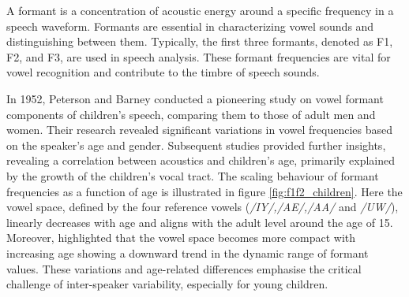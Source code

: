 A formant is a concentration of acoustic energy around a specific frequency in a speech waveform. Formants are essential in characterizing vowel sounds and distinguishing between them. Typically, the first three formants, denoted as F1, F2, and F3, are used in speech analysis. These formant frequencies are vital for vowel recognition and contribute to the timbre of speech sounds.

In 1952, Peterson and Barney \cite{first_vowel_study} conducted a pioneering study on vowel formant components of children's speech, comparing them to those of adult men and women. Their research revealed significant variations in vowel frequencies based on the speaker's age and gender. Subsequent studies \cite{reviewASRchildren,Acoustic_change_children,why_children_speech_no_working} provided further insights, revealing a correlation between acoustics and children's age, primarily explained by the growth of the children's vocal tract. The scaling behaviour of formant frequencies as a function of age is illustrated in figure \ref{fig:f1f2_children}. Here the vowel space, defined by the four reference vowels (\textit{/IY/,/AE/,/AA/} and \textit{/UW/}), linearly decreases with age and aligns with the adult level around the age of 15. Moreover, \cite{reviewASRchildren} highlighted that the vowel space becomes more compact with increasing age showing a downward trend in the dynamic range of formant values. These variations and age-related differences emphasise the critical challenge of inter-speaker variability, especially for young children.



